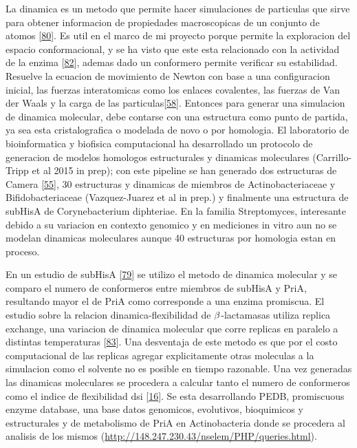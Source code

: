 \documentclass[12pt,twoside]{reedthesis}
\begin{document}
  La dinamica es un metodo que permite hacer simulaciones de particulas
  que sirve para obtener informacion de propiedades macroscopicas de un
  conjunto de atomos
  {[}\protect\hyperlink{ref-petrenkoux5fmolecularux5f2001}{80}{]}. Es util
  en el marco de mi proyecto porque permite la exploracion del espacio
  conformacional, y se ha visto que este esta relacionado con la actividad
  de la enzima
  {[}\protect\hyperlink{ref-sikosekux5fbiophysicsux5f2014}{82}{]}, ademas
  dado un conformero permite verificar su estabilidad. Resuelve la
  ecuacion de movimiento de Newton con base a una configuracion inicial,
  las fuerzas interatomicas como los enlaces covalentes, las fuerzas de
  Van der Waals y la carga de las
  particulas{[}\protect\hyperlink{ref-campbellux5fbiophysicalux5f2012}{58}{]}.
  Entonces para generar una simulacion de dinamica molecular, debe
  contarse con una estructura como punto de partida, ya sea esta
  cristalografica o modelada de novo o por homologia. El laboratorio de
  bioinformatica y biofisica computacional ha desarrollado un protocolo de
  generacion de modelos homologos estructurales y dinamicas moleculares
  (Carrillo-Tripp et al 2015 in prep); con este pipeline se han generado
  dos estructuras de Camera
  {[}\protect\hyperlink{ref-noda-garciaux5finsightsux5f2015}{55}{]}, 30
  estructuras y dinamicas de miembros de Actinobacteriaceae y
  Bifidobacteriaceae (Vazquez-Juarez et al in prep.) y finalmente una
  estructura de subHisA de Corynebacterium diphteriae. En la familia
  Streptomyces, interesante debido a su variacion en contexto genomico y
  en mediciones in vitro aun no se modelan dinamicas moleculares aunque 40
  estructuras por homologia estan en proceso.
  
  En un estudio de subHisA
  {[}\protect\hyperlink{ref-nodaux5festudioux5f2012}{79}{]} se utilizo el
  metodo de dinamica molecular y se comparo el numero de conformeros entre
  miembros de subHisA y PriA, resultando mayor el de PriA como corresponde
  a una enzima promiscua. El estudio sobre la relacion
  dinamica-flexibilidad de \(\noindent\beta\)-lactamasas utiliza replica
  exchange, una variacion de dinamica molecular que corre replicas en
  paralelo a distintas temperaturas
  {[}\protect\hyperlink{ref-baiux5freplicaux5f2006}{83}{]}. Una desventaja
  de este metodo es que por el costo computacional de las replicas agregar
  explicitamente otras moleculas a la simulacion como el solvente no es
  posible en tiempo razonable. Una vez generadas las dinamicas moleculares
  se procedera a calcular tanto el numero de conformeros como el indice de
  flexibilidad dsi
  {[}\protect\hyperlink{ref-zouux5fevolutionux5f2015}{16}{]}. Se esta
  desarrollando PEDB, promiscuous enzyme database, una base datos
  genomicos, evolutivos, bioquimicos y estructurales y de metabolismo de
  PriA en Actinobacteria donde se procedera al analisis de los mismos
  (\url{http://148.247.230.43/nselem/PHP/queries.html}).
  
\end{document}
